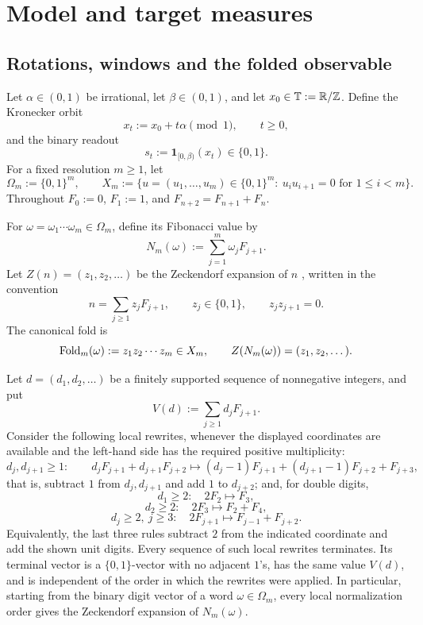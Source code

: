 \section{Model and target measures}

\subsection{Rotations, windows and the folded observable}

Let $\alpha\in(0,1)$ be irrational, let $\beta\in(0,1)$, and let
$x_0\in\mathbb{T}:=\mathbb{R}/\mathbb{Z}$.  Define the Kronecker orbit
\[
x_t:=x_0+t\alpha \pmod 1,\qquad t\ge 0,
\]
and the binary readout
\[
s_t:=\mathbf{1}_{[0,\beta)}(x_t)\in\{0,1\}.
\]
For a fixed resolution $m\ge 1$, let
\[
\Omega_m:=\{0,1\}^m,\qquad
X_m:=\{u=(u_1,\dots,u_m)\in\{0,1\}^m:\ u_i u_{i+1}=0\text{ for }1\le i<m\}.
\]
Throughout \(F_0:=0\), \(F_1:=1\), and
\(F_{n+2}=F_{n+1}+F_n\).

\begin{definition}\label{def:canonical-fold}
For \(\omega=\omega_1\cdots\omega_m\in\Omega_m\), define its Fibonacci value by
\[
N_m(\omega):=\sum_{j=1}^m \omega_j F_{j+1}.
\]
Let \(Z(n)=(z_1,z_2,\dots)\) be the Zeckendorf expansion of \(n\)
\cite{Zeckendorf1972}, written in the convention
\[
n=\sum_{j\ge 1} z_jF_{j+1},\qquad z_j\in\{0,1\},\qquad z_jz_{j+1}=0.
\]
The canonical fold is
\[
\mathrm{Fold}_m(\omega):=z_1z_2\cdots z_m\in X_m,
\qquad Z(N_m(\omega))=(z_1,z_2,\dots).
\]
\end{definition}

\begin{theorem}\label{thm:local-zeckendorf-normalization}
Let \(d=(d_1,d_2,\dots)\) be a finitely supported sequence of nonnegative
integers, and put
\[
V(d):=\sum_{j\ge1} d_jF_{j+1}.
\]
Consider the following local rewrites, whenever the displayed coordinates are
available and the left-hand side has the required positive multiplicity:
\[
d_j,d_{j+1}\ge1:
\qquad
d_jF_{j+1}+d_{j+1}F_{j+2}
\longmapsto
(d_j-1)F_{j+1}+(d_{j+1}-1)F_{j+2}+F_{j+3},
\]
that is, subtract \(1\) from \(d_j,d_{j+1}\) and add \(1\) to \(d_{j+2}\);
and, for double digits,
\[
d_1\ge2:\quad 2F_2\longmapsto F_3,
\]
\[
d_2\ge2:\quad 2F_3\longmapsto F_2+F_4,
\]
\[
d_j\ge2,\ j\ge3:\quad 2F_{j+1}\longmapsto F_{j-1}+F_{j+2}.
\]
Equivalently, the last three rules subtract \(2\) from the indicated
coordinate and add the shown unit digits.  Every sequence of such local
rewrites terminates.  Its terminal vector is a \(\{0,1\}\)-vector with no
adjacent \(1\)'s, has the same value \(V(d)\), and is independent of the
order in which the rewrites were applied.  In particular, starting from the
binary digit vector of a word \(\omega\in\Omega_m\), every local normalization
order gives the Zeckendorf expansion of \(N_m(\omega)\).
\end{theorem}

